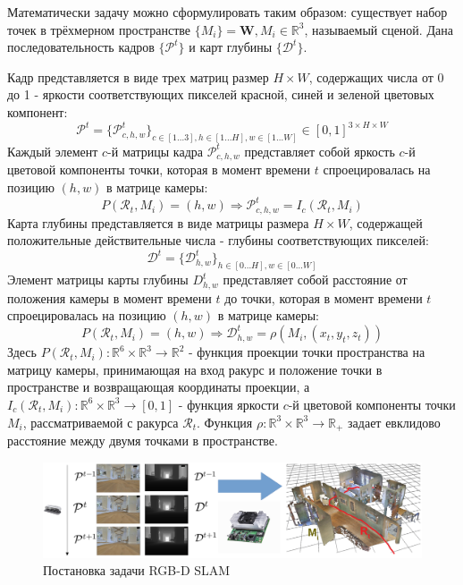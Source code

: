 \documentclass{mipt-thesis-ms}
\begin{document}
	Математически задачу можно сформулировать таким образом: существует набор точек в трёхмерном пространстве $\{M_i \} = \textbf{W}, M_i \in \mathbb{R}^3$, называемый сценой. Дана последовательность кадров $\{\mathcal{P}^t\}$ и карт глубины $\{\mathcal{D}^t\}$.
	
	Кадр представляется в виде трех матриц размер $H \times W$, содержащих числа от 0 до 1 - яркости соответствующих пикселей красной, синей и зеленой цветовых компонент:
	$$\mathcal{P}^t = \{\mathcal{P}^t_{c,h,w}\}_{c \in [1 \dots 3], h \in [1 \dots H], w \in [1 \dots W]} \in [0, 1]^{3 \times H \times W}$$
	Каждый элемент $c$-й матрицы кадра $\mathcal{P}^t_{c,h,w}$ представляет собой яркость $c$-й цветовой компоненты точки, которая в момент времени $t$ спроецировалась на позицию $(h, w)$ в матрице камеры:
	$$P(\mathcal{R}_t, M_i) = (h, w) \Rightarrow \mathcal{P}^t_{c,h,w} = I_c(\mathcal{R}_t, M_i)$$
	Карта глубины представляется в виде матрицы размера $H \times W$, содержащей положительные действительные числа - глубины соответствующих пикселей:
	$$\mathcal{D}^t = \{\mathcal{D}^t_{h,w}\}_{h \in [0 \dots H], w \in [0 \dots W]}$$
	Элемент матрицы карты глубины $D^t_{h,w}$ представляет собой расстояние от положения камеры в момент времени $t$ до точки, которая в момент времени $t$ спроецировалась на позицию $(h, w)$ в матрице камеры: 
	$$P(\mathcal{R}_t, M_i) = (h, w) \Rightarrow \mathcal{D}^t_{h,w} = \rho(M_i, (x_t, y_t, z_t))$$
	Здесь $P(\mathcal{R}_t, M_i): \mathbb{R}^6 \times \mathbb{R}^3 \rightarrow \mathbb{R}^2$ - функция проекции точки пространства на матрицу камеры, принимающая на вход ракурс и положение точки в пространстве и возвращающая координаты проекции, а $I_c (\mathcal{R}_t, M_i): \mathbb{R}^6 \times \mathbb{R}^3 \rightarrow [0, 1]$ - функция яркости $c$-й цветовой компоненты точки $M_i$, рассматриваемой с ракурса $\mathcal{R}_t$. Функция $\rho: \mathbb{R}^3 \times \mathbb{R}^3 \rightarrow \mathbb{R}_{+}$ задает евклидово расстояние между двумя точками в пространстве.
	
	\begin{figure}
		\includegraphics[width=1.0\textwidth]{img/rgbdslam_problem_setting.png}
		\caption{Постановка задачи RGB-D SLAM}
		\label{figure_rgbdslam_setting}
	\end{figure}
	
\end{document}
